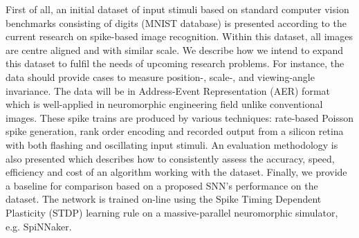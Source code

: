 First of all, an initial dataset of input stimuli based on standard computer vision benchmarks consisting of %
digits (MNIST database) is presented according to the current research on spike-based image recognition.
Within this dataset, all images are centre aligned and with similar scale.
We describe how we intend to expand this dataset to fulfil the needs of upcoming research problems.
For instance, the data should provide cases to measure position-, scale-, and viewing-angle invariance.
The data will be in Address-Event Representation (AER) format which is well-applied in neuromorphic engineering field unlike conventional images.
These spike trains are produced by various techniques: rate-based Poisson spike generation, rank order encoding and recorded output from a silicon retina with both flashing and oscillating input stimuli.
An evaluation methodology is also presented which describes how to consistently assess the accuracy, speed, efficiency and cost of an algorithm working with the dataset.
Finally, we provide a baseline for comparison based on a proposed SNN's performance on the dataset.
The network is trained on-line using the Spike Timing Dependent Plasticity (STDP) learning rule on a massive-parallel neuromorphic simulator, e.g. SpiNNaker.
